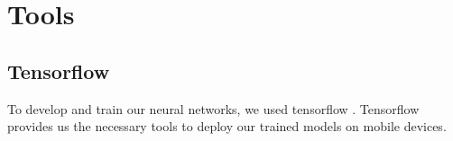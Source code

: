 \section{Tools}
\subsection{Tensorflow}
To develop and train our neural networks, we used tensorflow \cite{abadi2016tensorflow}. Tensorflow provides us the necessary tools to deploy our trained models on mobile devices. 
\fi





